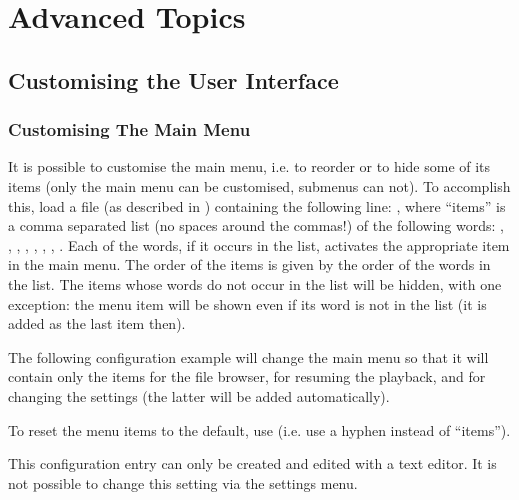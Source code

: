 \chapter{Advanced Topics}

\section{\label{ref:CustomisingUI}Customising the User Interface}

\subsection{\label{ref:CustomisingTheMainMenu}Customising The Main Menu}

It is possible to customise the main menu, i.e. to reorder or to hide some
of its items (only the main menu can be customised, submenus can not).
To accomplish this, load a  file (as described in
) containing the following line:
, where ``items'' is a comma separated list
(no spaces around the commas!) of the following
words: , , %
, , %
, ,
, .
Each of the words, if it occurs in the list, activates the appropriate item
in the main menu. The order of the items is given by the order of the words
in the list. The items whose words do not occur in the list will be hidden,
with one exception: the menu item  will be shown even if
its word is not in the list (it is added as the last item then).

The following configuration example will change the main menu so that it will
contain only the items for the file browser, for resuming the playback, and
for changing the settings (the latter will be added automatically).
\begin{example}
\end{example}


To reset the menu items to the default, use  (i.e.
use a hyphen instead of ``items'').

This configuration entry can only be created and edited with a text editor. It is
not possible to change this setting via the settings menu.

